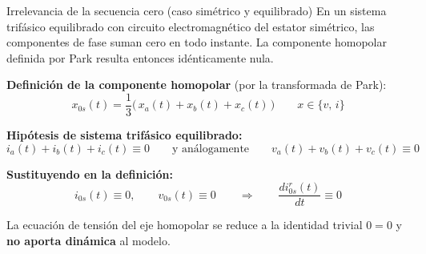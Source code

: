 \documentclass[aspectratio=169,t]{beamer}
\begin{document}
\begin{frame}{Irrelevancia de la secuencia cero (caso simétrico y equilibrado)}
{\small\color{uncGray}En un sistema trifásico equilibrado con circuito electromagnético del estator simétrico, las componentes de fase suman cero en todo instante. La componente homopolar definida por Park resulta entonces idénticamente nula.}\par
\vspace{3mm}

\textbf{Definición de la componente homopolar} (por la transformada de Park):
\begin{equation*}
x_{0s}(t) = \frac{1}{3}\big(\,x_a(t) + x_b(t) + x_c(t)\,\big)
\qquad x\in\{v,\,i\}
\end{equation*}

\textbf{Hipótesis de sistema trifásico equilibrado:}
\begin{equation*}
i_a(t) + i_b(t) + i_c(t) \equiv 0
\qquad\text{y análogamente}\qquad
v_a(t) + v_b(t) + v_c(t) \equiv 0
\end{equation*}

\textbf{Sustituyendo en la definición:}
\begin{equation*}
i_{0s}(t) \equiv 0,
\qquad
v_{0s}(t) \equiv 0
\qquad\Rightarrow\qquad
\frac{d i_{0s}^{r}(t)}{dt} \equiv 0
\end{equation*}

{\small La ecuación de tensión del eje homopolar se reduce a la identidad trivial $0=0$ y \textbf{no aporta dinámica} al modelo.}
\end{frame}
\end{document}
